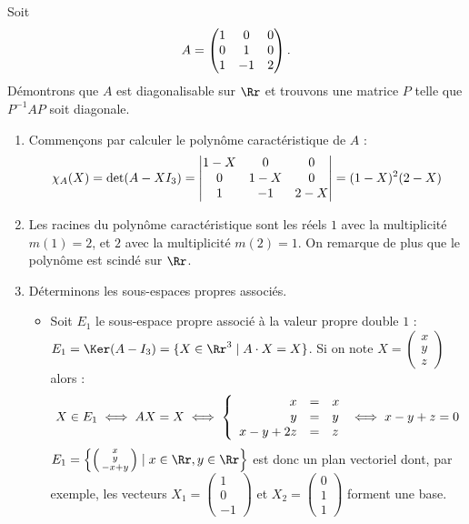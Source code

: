 \documentclass[12pt, class=report,crop=false]{standalone}
\begin{document}
\begin{exemple}
Soit $$A=\left(\begin{matrix}1&0&0\cr0&1&0\cr1&-1&2\end{matrix}\right).$$
Démontrons que $A$ est diagonalisable sur $\Rr$ et trouvons une matrice $P$ telle que $P^{-1}AP$ soit diagonale.


\begin{enumerate}
  \item Commençons par calculer le polynôme caractéristique de $A$ :
$$\chi_A(X)
= \det(A-XI_3) 
= \begin{vmatrix}1-X&0&0\cr 0&1-X&0\cr1&-1&2-X\end{vmatrix}
=(1-X)^2(2-X)$$
  
  \item Les racines du polynôme caractéristique sont les réels $1$ avec la multiplicité $m(1)=2$, et $2$ avec la multiplicité $m(2)=1$. On remarque de plus que le polynôme est scindé sur $\Rr$.

  
  \item Déterminons les sous-espaces propres associés.
  \begin{itemize}
    \item Soit $E_1$ le sous-espace propre associé à la valeur propre double $1$ : $E_1 = \Ker(A-I_3) = \{X \in \Rr^3 \mid A \cdot X=X\}$.
Si on note $X = \left(\begin{smallmatrix}x\\y\\z\end{smallmatrix}\right)$ alors :
$$X\in E_1\iff AX=X \iff \left\{\begin{array}{rcl}
x&=&x\cr 
y&=&y\cr 
x-y+2z&=&z
\end{array}\right.\iff x-y+z = 0$$
$E_1 = \left\lbrace\left(\begin{smallmatrix}x\\y\\-x+y\end{smallmatrix}\right) \mid x \in \Rr, y\in \Rr\right\rbrace$ est donc un plan vectoriel dont, par exemple, les vecteurs 
$X_1=\left(\begin{smallmatrix}1\\0\\-1\end{smallmatrix}\right)$ et 
$X_2=\left(\begin{smallmatrix}0\\1\\1\end{smallmatrix}\right)$ forment une base.


\end{itemize}
\end{enumerate}
\end{exemple}
\end{document}
